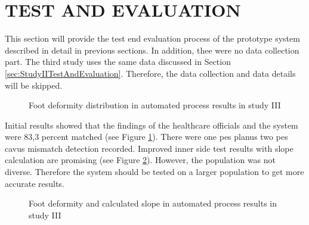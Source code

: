 \section{TEST AND EVALUATION}\label{sec:StudyIIITestAndEvaluation}

This section will provide the test end evaluation process of the prototype system described in detail in previous sections. In addition, thee were no data collection part. The third study uses the same data discussed in Section \ref{sec:StudyIITestAndEvaluation}. Therefore, the data collection and data details will be skipped.

\begin{figure}[htbp]
\centering
{}
\caption{Foot deformity distribution in automated process results in study III}
\label{fig:StudyIIIFootDeformityAutomatedProcessResults}
\end{figure} 

Initial results showed that the findings of the healthcare officials and the system were 83,3 percent matched (see Figure \ref{fig:StudyIIIFootDeformityAutomatedProcessResults}). There were one pes planus two pes cavus mismatch detection recorded. Improved inner side test results with slope calculation are promising (see Figure \ref{fig:StudyIIISlopeResults}). However, the population was not diverse. Therefore the system should be tested on a larger population to get more accurate results.

\begin{figure}[htbp]
\centering
{}
\caption{Foot deformity and calculated slope in automated process results in study III}
\label{fig:StudyIIISlopeResults}
\end{figure} 
